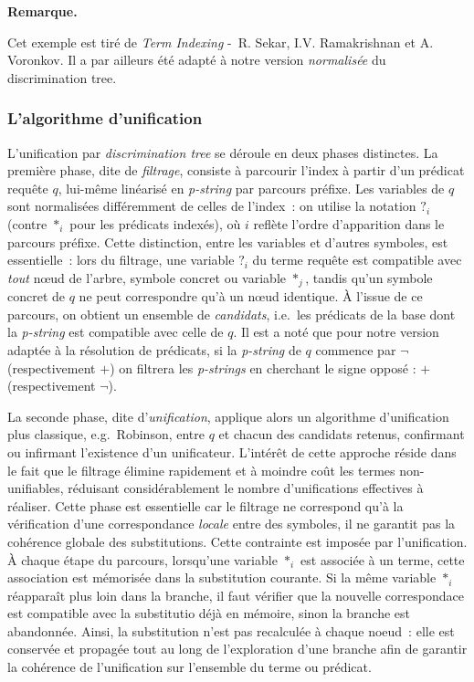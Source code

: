 \documentclass[11pt]{article}
\newenvironment{remarque}{%
    \begin{mdframed}[
        linecolor=sectioncolor!40,
        linewidth=0.8pt,
        backgroundcolor=sectioncolor!5,
        innerleftmargin=10pt,
        innerrightmargin=10pt,
        innertopmargin=6pt,
        innerbottommargin=6pt,
        skipabove=8pt,
        skipbelow=8pt
    ]
    \noindent\textbf{\small\color{sectioncolor}Remarque.}\enspace\small\itshape
}{%
    \end{mdframed}
}
\begin{document}
\begin{remarque}
    Cet exemple est tiré de \emph{Term Indexing} -~R. Sekar, 
    I.V. Ramakrishnan et A. Voronkov\cite{TermIndexing}. Il a par ailleurs 
    été adapté à notre version \emph{normalisée} du discrimination tree.
\end{remarque}

\subsubsection{L'algorithme d'unification}
    L'unification par \textit{discrimination tree} se déroule en deux phases distinctes. 
    La première phase, dite de \textit{filtrage}, consiste à parcourir l'index à partir 
    d'un prédicat requête $q$, lui-même linéarisé en \textit{p-string} par parcours préfixe. 
    Les variables de $q$ sont normalisées différemment de celles de l'index~: on utilise la 
    notation $?_i$ (contre $*_i$ pour les prédicats indexés), où $i$ reflète l'ordre 
    d'apparition dans le parcours préfixe. Cette distinction, entre les variables et d'autres symboles, est essentielle~: lors du 
    filtrage, une variable $?_i$ du terme requête est compatible avec \textit{tout} nœud de 
    l'arbre, symbole concret ou variable $*_j$, tandis qu'un symbole concret de $q$ ne 
    peut correspondre qu'à un nœud identique. À l'issue de ce parcours, on obtient un ensemble de \textit{candidats}, i.e.~les prédicats de la base dont la \textit{p-string} est compatible avec celle de $q$. Il est a noté que pour notre version adaptée à la résolution de prédicats, si la \textit{p-string} de $q$ commence par $\neg$ (respectivement $+$) on filtrera les \textit{p-strings} en cherchant le signe opposé : $+$ (respectivement $\neg$).

    \vspace{0.2cm}
    La seconde phase, dite d'\textit{unification}, applique 
    alors un algorithme d'unification plus classique, e.g.~Robinson, entre $q$ et chacun des candidats retenus, 
    confirmant ou infirmant l'existence d'un unificateur. L'intérêt de cette approche réside 
    dans le fait que le filtrage élimine rapidement et à moindre coût les termes 
    non-unifiables, réduisant considérablement le nombre d'unifications effectives à réaliser.
    Cette phase est essentielle car le filtrage ne correspond qu'à la vérification d'une correspondance \textit{locale}
    entre des symboles, il ne garantit pas la cohérence globale des substitutions. Cette contrainte est imposée
    par l'unification. À chaque étape du parcours, lorsqu'une variable $*_i$ est associée à un terme, cette
    association est mémorisée dans la substitution courante. Si la même variable $*_i$ réapparaît
    plus loin dans la branche, il faut vérifier que la nouvelle correspondace est compatible
    avec la substitutio déjà en mémoire, sinon la branche est abandonnée. Ainsi, la substitution n'est pas recalculée
    à chaque noeud~: elle est conservée et propagée tout au long de l'exploration d'une branche afin
    de garantir la cohérence de l'unification sur l'ensemble du terme ou prédicat.
\end{document}
